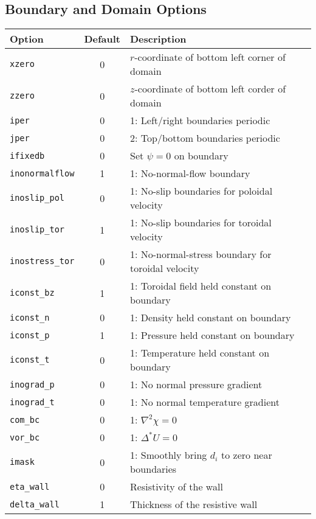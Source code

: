 \documentclass[letterpaper]{book}
\begin{document}
\subsection{Boundary and Domain Options}

\begin{tabular}{lcp{2.5in}}
  \textbf{Option} & \textbf{Default} & \textbf{Description}\\
  \hline
  \texttt{xzero}  & 0 & $r$-coordinate of bottom left corner of domain\\
  \texttt{zzero}  & 0 & $z$-coordinate of bottom left corder of domain\\
  \texttt{iper}   & 0 & 1: Left/right boundaries periodic\\
  \texttt{jper}   & 0 & 2: Top/bottom boundaries periodic\\
  \hline
  \texttt{ifixedb} & 0 & Set $\psi=0$ on boundary\\
  \texttt{inonormalflow}& 1 & 1: No-normal-flow boundary\\
  \texttt{inoslip\_pol} & 0 & 1: No-slip boundaries for poloidal velocity\\
  \texttt{inoslip\_tor} & 1 & 1: No-slip boundaries for toroidal velocity\\
  \texttt{inostress\_tor}&0 & 1: No-normal-stress boundary for toroidal 
                                 velocity\\
  \texttt{iconst\_bz} & 1 & 1: Toroidal field held constant on boundary\\
  \texttt{iconst\_n}  & 0 & 1: Density held constant on boundary\\
  \texttt{iconst\_p}  & 1 & 1: Pressure held constant on boundary\\
  \texttt{iconst\_t}  & 0 & 1: Temperature held constant on boundary\\
  \texttt{inograd\_p} & 0 & 1: No normal pressure gradient\\
  \texttt{inograd\_t} & 0 & 1: No normal temperature gradient\\
  \texttt{com\_bc}& 0 & 1: $\nabla^2 \chi = 0$\\
  \texttt{vor\_bc}& 0 & 1: $\Delta^* U = 0$\\
  \texttt{imask}  & 0 & 1: Smoothly bring $d_i$ to zero near
    boundaries\\
  \hline
  \texttt{eta\_wall}   & 0 & Resistivity of the wall\\
  \texttt{delta\_wall} & 1 & Thickness of the resistive wall
\end{tabular}
\end{document}
